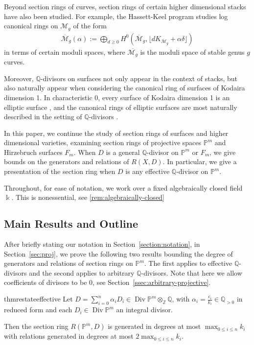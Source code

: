 \documentclass{amsart}
\theoremstyle{plain}
\theoremstyle{definition}
\theoremstyle{remark}
\numberwithin{equation}{section}
\newcommand\ssec{\subsection}
\newcommand\bq{{\mathbb Q}}
\newcommand\bp{{\mathbb P}}
\newcommand\bz{{\mathbb Z}}
\newcommand\bk{{\Bbbk}}
\DeclareMathOperator\di{Div}
\newcommand\hirz{F}
\begin{document}
Beyond section rings of curves, section rings of certain higher dimensional
stacks have also been studied.
For example, the Hassett-Keel program \cite{hassett:classical-and-minimal-models}
studies log canonical rings on ${\mathscr M}_g$ of the form 
\begin{align*}
	\overline {\mathscr M}_g(\alpha) := \bigoplus_{d \geq 0} H^0 \left(
	\overline {\mathscr M}_g, \lfloor d K_{\overline{\mathscr M}_g} +
	\alpha\delta \rfloor  \right) 
\end{align*}
in terms of certain moduli spaces, where $\overline {\mathscr M_g}$ is the
moduli space of stable genus $g$ curves.

Moreover, $\bq$-divisors on surfaces not only appear in the context of stacks,
but also naturally
appear when considering the canonical ring of surfaces of Kodaira dimension 1.
In characteristic 0, every surface of Kodaira dimension 1 is an elliptic surface \cite[p. 244]{
barthHPV:compactComplexSurfaces}, and
the canonical rings of elliptic surfaces are most naturally described in the setting of
$\bq$-divisors \cite[Chapter V, Theorem 12.1]{barthHPV:compactComplexSurfaces}. 

In this paper, we continue the study of section rings of
surfaces and higher dimensional varieties, examining section rings of
projective spaces $\bp^m$ and Hirzebruch surfaces $\hirz_m$.
When $D$ is a general $\bq$-divisor on $\bp^m$ or
$\hirz_m$, we give bounds on the generators and relations of
$R(X, D)$. In particular, we give a presentation of the
section ring when $D$ is any effective
$\bq$-divisor on $\bp^m$.  

Throughout, for ease of notation,
we work over a fixed algebraically closed field $\bk$.
This is nonessential, see \autoref{rem:algebraically-closed}


\ssec{Main Results and Outline}
\label{ssec:main}

After briefly stating our notation in Section~\ref{section:notation},
in Section~\ref{sec:proj}, we prove the following two results bounding
the degree of generators and relations of
section rings on $\bp^m$. The first applies
to effective $\bq$-divisors and the second applies to arbitrary
$\bq$-divisors. Note that here we allow coefficients of divisors to be 0,
see Section~\ref{ssec:arbitrary-projective}.

\begin{restatable}{thm}{restateeffective}
\label{thm:proj-effective-intro}
Let $D = \sum_{i = 0}^{n} \alpha_i D_i \in \di \bp^m \otimes_\bz \bq$, with $\alpha_i =
\frac{c_i}{k_i} \in \bq_{> 0}$ in reduced form and each $D_i \in \di \bp^m$ an integral divisor.

Then the section ring $R(\bp^m, D)$
is generated in degrees at most $\max_{0 \leq i \leq n}{k_i}$ with
relations generated in degrees at most $2 \max_{0 \leq i \leq n}{k_i}$.
\end{restatable}
\end{document}
